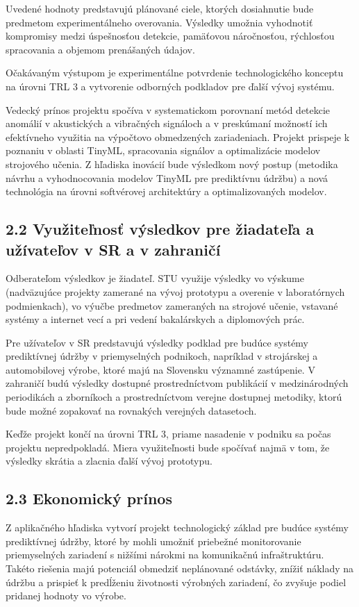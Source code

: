 \documentclass[10pt,a4paper]{article}
\begin{document}
Uvedené hodnoty predstavujú plánované ciele, ktorých dosiahnutie bude predmetom experimentálneho overovania. Výsledky umožnia vyhodnotiť kompromisy medzi úspešnosťou detekcie, pamäťovou náročnosťou, rýchlosťou spracovania a objemom prenášaných údajov.

Očakávaným výstupom je experimentálne potvrdenie technologického konceptu na úrovni TRL 3 a vytvorenie odborných podkladov pre ďalší vývoj systému.

Vedecký prínos projektu spočíva v systematickom porovnaní metód detekcie anomálií v akustických a vibračných signáloch a v preskúmaní možností ich efektívneho využitia na výpočtovo obmedzených zariadeniach. Projekt prispeje k poznaniu v oblasti TinyML, spracovania signálov a optimalizácie modelov strojového učenia. Z hľadiska inovácií bude výsledkom nový postup (metodika návrhu a vyhodnocovania modelov TinyML pre prediktívnu údržbu) a nová technológia na úrovni softvérovej architektúry a optimalizovaných modelov.

\subsection*{2.2 Využiteľnosť výsledkov pre žiadateľa
a užívateľov v SR a v zahraničí}

Odberateľom výsledkov je žiadateľ. STU využije výsledky vo výskume (nadväzujúce projekty zamerané na vývoj prototypu a overenie v laboratórnych podmienkach), vo výučbe predmetov zameraných na strojové učenie, vstavané systémy a internet vecí a pri vedení bakalárskych a diplomových prác.

Pre užívateľov v SR predstavujú výsledky podklad pre budúce systémy prediktívnej údržby v priemyselných podnikoch, napríklad v strojárskej a automobilovej výrobe, ktoré majú na Slovensku významné zastúpenie. V zahraničí budú výsledky dostupné prostredníctvom publikácií v medzinárodných periodikách a zborníkoch a prostredníctvom verejne dostupnej metodiky, ktorú bude možné zopakovať na rovnakých verejných datasetoch.

Keďže projekt končí na úrovni TRL 3, priame nasadenie v podniku sa počas projektu nepredpokladá. Miera využiteľnosti bude spočívať najmä v tom, že výsledky skrátia a zlacnia ďalší vývoj prototypu.

\subsection*{2.3 Ekonomický prínos}

Z aplikačného hľadiska vytvorí projekt technologický základ pre budúce systémy prediktívnej údržby, ktoré by mohli umožniť priebežné monitorovanie priemyselných zariadení s nižšími nárokmi na komunikačnú infraštruktúru. Takéto riešenia majú potenciál obmedziť neplánované odstávky, znížiť náklady na údržbu a prispieť k predĺženiu životnosti výrobných zariadení, čo zvyšuje podiel pridanej hodnoty vo výrobe.
\end{document}
